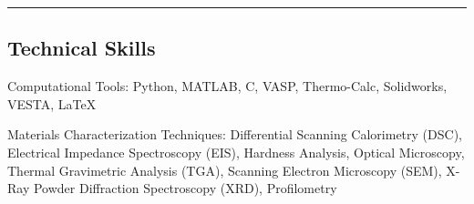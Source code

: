 \documentclass[10pt,letterpaper]{article}
\newenvironment{indentsection}[1]%
{\begin{list}{}%
  {\setlength{\leftmargin}{#1}}%
  \item[]%
}
{\end{list}}
\newcommand{\CPP}
{C\nolinebreak[4]\hspace{-.05em}\raisebox{.22ex}{\footnotesize\bf ++}}
\begin{document}
%

%
%

\hrule
\vspace{-0.6em}
\subsection*{Technical Skills}

\begin{indentsection}{\parindent}
\begin{description*}
  \item[Computational Tools:]
  Python, MATLAB, \CPP, VASP, Thermo-Calc, Solidworks, VESTA, \LaTeX
  \item[Materials Characterization Techniques:]
  Differential Scanning Calorimetry (DSC), Electrical Impedance Spectroscopy (EIS), Hardness Analysis, Optical Microscopy, Thermal Gravimetric Analysis (TGA), Scanning Electron Microscopy (SEM), X-Ray Powder Diffraction Spectroscopy (XRD), Profilometry

\end{description*}
\end{indentsection}
\end{document}
